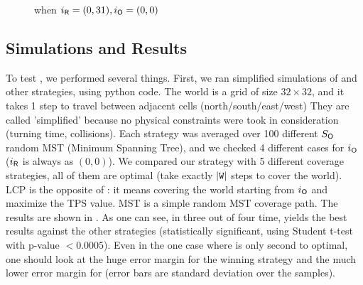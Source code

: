 \documentclass[a4paper,11pt]{article}
\theoremstyle{definition}
\newcommand{\rob}{{{\sf R}}\xspace}
\newcommand{\opp}{{{\sf O}}\xspace}
\newcommand{\w}{{{\texttt W}}\xspace}
\newcommand{\ltr}{{{\sf{LTR}}}\xspace}
\DeclarePairedDelimiter\abs{\lvert}{\rvert}%
\begin{document}
\begin{figure}[thpb]
    \centering
    \caption{\ltr when $i_\rob=(0,31), i_\opp=(0,0)$}
    \label{figures :best known path}
\end{figure}


\subsection{Simulations and Results}
To test \ltr, we performed several things. First, we ran simplified simulations of \ltr and other strategies, using python code. The world is a grid of size $32\times 32$, and it takes 1 step to travel between adjacent cells (north/south/east/west)%
They are called 'simplified' because no physical constraints were took in consideration (turning time, collisions). Each strategy was averaged over 100 different $S_\opp$ random MST (Minimum Spanning Tree), and we checked 4 different cases for $i_\opp$ ($i_\rob$ is always as $(0,0)$). We compared our strategy with 5 different coverage strategies, all of them are optimal (take exactly $\abs*{\w}$ steps to cover the world). %
LCP is the opposite of \ltr: it means covering the world starting from $i_\opp$ and maximize the TPS value.  MST is a simple random MST coverage path.
The results are shown in . As one can see, in three out of four time, \ltr yields the best results against the other strategies (statistically significant, using Student t-test with p-value $<0.0005$).
Even in the one case where \ltr is only second to optimal, one should look at the huge error margin for the winning strategy and the much lower error margin for \ltr (error bars are standard deviation over the samples).
\end{document}

